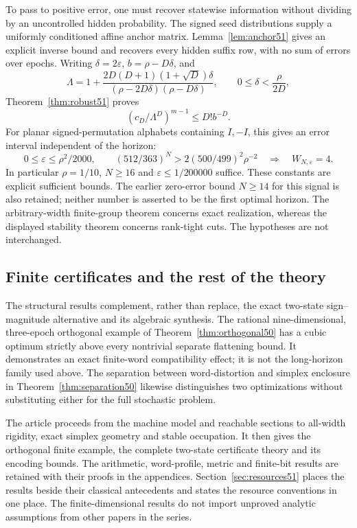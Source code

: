 To pass to positive error, one must recover statewise information
without dividing by an uncontrolled hidden probability. The signed
seed distributions supply a uniformly conditioned affine anchor
matrix. Lemma~\ref{lem:anchor51} gives an explicit inverse bound and
recovers every hidden suffix row, with no sum of errors over epochs.
Writing $\delta=2\varepsilon$, $b=\rho-D\delta$, and
\[
 \Lambda=1+
 \frac{2D(D+1)(1+\sqrt D)\delta}
      {(\rho-2D\delta)(\rho-D\delta)},\qquad
                  0\le\delta<\frac{\rho}{2D},
\]
Theorem~\ref{thm:robust51} proves
\[
                 (c_D/\Lambda^D)^{m-1}\le D!b^{-D}.
\]
For planar signed-permutation alphabets containing $I,-I$, this gives
an error interval independent of the horizon:
\[
 0\le\varepsilon\le\rho^2/2000,\qquad
 (512/363)^N>2(500/499)^2\rho^{-2}
       \quad\Longrightarrow\quad W_{N,\varepsilon}=4.
\]
In particular $\rho=1/10$, $N\ge16$ and
$\varepsilon\le1/200000$ suffice. These constants are explicit
sufficient bounds. The earlier zero-error bound $N\ge14$ for this
signal is also retained; neither number is asserted to be the first
optimal horizon. The arbitrary-width finite-group theorem concerns
exact realization, whereas the displayed stability theorem concerns
rank-tight cuts. The hypotheses are not interchanged.

\subsection{Finite certificates and the rest of the theory}
The structural results complement, rather than replace, the exact
two-state sign--magnitude alternative and its algebraic synthesis.
The rational nine-dimensional, three-epoch orthogonal example of
Theorem~\ref{thm:orthogonal50} has a cubic optimum strictly above
every nontrivial separate flattening bound. It demonstrates an exact
finite-word compatibility effect; it is not the long-horizon family
used above. The separation between word-distortion and simplex
enclosure in Theorem~\ref{thm:separation50} likewise distinguishes
two optimizations without substituting either for the full stochastic
problem.

The article proceeds from the machine model and reachable sections to
all-width rigidity, exact simplex geometry and stable occupation. It
then gives the orthogonal finite example, the complete two-state
certificate theory and its encoding bounds. The arithmetic,
word-profile, metric and finite-bit results are retained with their
proofs in the appendices. Section~\ref{sec:resources51} places the
results beside their classical antecedents and states the resource
conventions in one place. The finite-dimensional results do not
import unproved analytic assumptions from other papers in the series.
